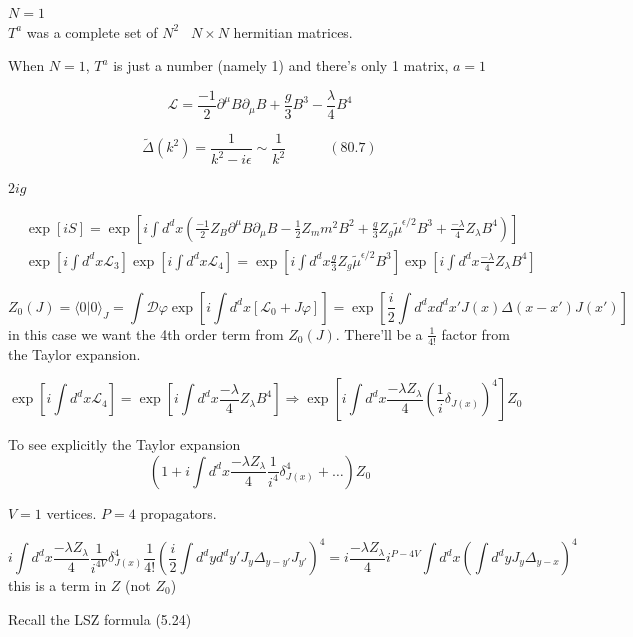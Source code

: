 \documentclass[twoside]{amsart}
\begin{document}
$N=1$ \\
$T^a$ was a complete set of $N^2$ \, $N\times N$ hermitian matrices.  

When $N=1$, $T^a$ is just a number (namely 1) and there's only 1 matrix, $a=1$

\[
\mathcal{L} = \frac{-1}{2} \partial^{\mu} B \partial_{\mu} B + \frac{g}{3} B^3 - \frac{\lambda}{4} B^4
\]

\[
\widetilde{\Delta}{ (k^2)} = \frac{1 }{ k^2 - i \epsilon } \sim \frac{1}{k^2} \quad \quad \quad (80.7)
\]

$2ig$ 

\[
\begin{aligned}
& \exp{ [ iS ] } = \exp{ [i \int d^d x \left( \frac{-1}{2} Z_B \partial^{\mu} B \partial_{\mu} B - \frac{1}{2} Z_m m^2 B^2 + \frac{g}{3} Z_g \widetilde{\mu}^{\epsilon/2} B^3 + \frac{-\lambda}{4} Z_{\lambda} B^4  \right) ] } \\ 
& \exp{ \left[ i \int d^d x \mathcal{L}_3  \right] } \exp{ \left[ i \int d^dx \mathcal{L}_4 \right] } = \exp{ \left[ i \int d^d x \frac{g}{3} Z_g \widetilde{\mu}^{\epsilon/2} B^3 \right] } \exp{ \left[ i \int d^dx \frac{ -\lambda}{4} Z_{\lambda} B^4 \right] }
\end{aligned}
\]

\[
Z_0(J) = \langle 0 | 0 \rangle_J = \int \mathcal{D} \varphi \exp{ \left[ i \int d^dx [ \mathcal{L}_0 + J \varphi ] \right] } = \exp{ \left[ \frac{i}{2} \int d^dx d^dx' J(x) \Delta(x-x') J(x') \right] }
\]
in this case we want the 4th order term from $Z_0(J)$.  There'll be a $\frac{1}{4!}$ factor from the Taylor expansion.

\[
\exp{ \left[ i \int d^dx \mathcal{L}_4 \right] } = \exp{ \left[ i \int d^dx \frac{-\lambda}{4} Z_{\lambda} B^4 \right] } \Longrightarrow \exp{ \left[ i \int d^dx \frac{-\lambda Z_{\lambda} }{4} \left( \frac{1}{i} \delta_{J(x)} \right)^4 \right]}Z_0
\]

To see explicitly the Taylor expansion
\[
(1 + i \int d^dx \frac{-\lambda Z_{\lambda}}{4} \frac{1}{i^4} \delta_{J(x)}^4 + \dots ) Z_0
\]

$V=1$ vertices.  $P=4$ propagators.  

\[
i \int d^dx \frac{-\lambda Z_{\lambda}}{ 4} \frac{1}{ i^{4V}} \delta_{J(x)}^4 \frac{1}{4!} \left( \frac{i}{2} \int d^dy d^dy' J_y \Delta_{y-y'} J_{y'} \right)^4 = i \frac{-\lambda Z_{\lambda}}{ 4} i^{P - 4V} \int d^dx \left( \int d^dy J_y \Delta_{y-x} \right)^4
\]
this is a term in $Z$ (not $Z_0$)


Recall the LSZ formula (5.24)
\end{document}
